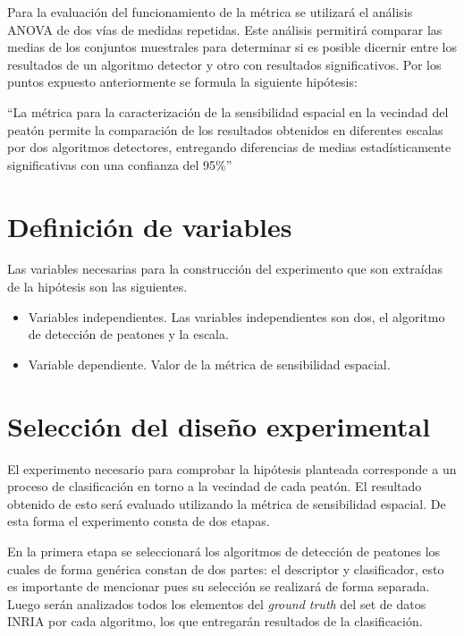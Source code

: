 Para la evaluación del funcionamiento de la métrica se utilizará el análisis ANOVA de dos vías de medidas repetidas. Este análisis permitirá comparar las medias de los conjuntos muestrales para determinar si es posible dicernir entre los resultados de un algoritmo detector y otro con resultados significativos. Por los puntos expuesto anteriormente se formula la siguiente hipótesis:

``La métrica para la caracterización de la sensibilidad espacial en la vecindad del peatón permite la comparación de los resultados obtenidos en diferentes escalas por dos algoritmos detectores, entregando diferencias de medias estadísticamente significativas con una confianza del 95\%''

\section{Definición de variables}

Las variables necesarias para la construcción del experimento que son extraídas de la hipótesis son las siguientes.

\begin{itemize}
\item Variables independientes. Las variables independientes son dos, el algoritmo de detección de peatones y la escala.

\item Variable dependiente. Valor de la métrica de sensibilidad espacial.
\end{itemize}

\section{Selección del diseño experimental}

El experimento necesario para comprobar la hipótesis planteada corresponde a un proceso de clasificación en torno a la vecindad de cada peatón. El resultado obtenido de esto será evaluado utilizando la métrica de sensibilidad espacial. De esta forma el experimento consta de dos etapas.

En la primera etapa se seleccionará los algoritmos de detección de peatones los cuales de forma genérica constan de dos partes: el descriptor y clasificador, esto es importante de mencionar pues su selección se realizará de forma separada. Luego serán analizados todos los elementos del \textit{ground truth} del set de datos INRIA por cada algoritmo, los que entregarán resultados de la clasificación.


